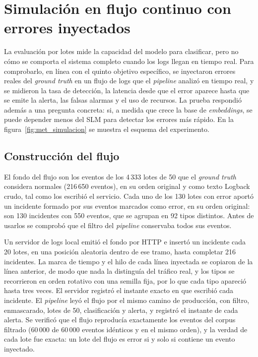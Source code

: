 \section{Simulación en flujo continuo con errores inyectados}\label{sec:met_simulacion}\label{sec:met_inyeccion}

La evaluación por lotes mide la capacidad del modelo para clasificar, pero no cómo se comporta el sistema completo cuando los logs llegan en tiempo real. Para comprobarlo, en línea con el quinto objetivo específico, se inyectaron errores reales del \textit{ground truth} en un flujo de logs que el \textit{pipeline} analizó en tiempo real, y se midieron la tasa de detección, la latencia desde que el error aparece hasta que se emite la alerta, las falsas alarmas y el uso de recursos. La prueba respondió además a una pregunta concreta: si, a medida que crece la base de \textit{embeddings}, se puede depender menos del SLM para detectar los errores más rápido. En la figura~\ref{fig:met_simulacion} se muestra el esquema del experimento.


\subsection{Construcción del flujo}

El fondo del flujo son los eventos de los 4\,333 lotes de 50 que el \textit{ground truth} considera normales (216\,650 eventos), en su orden original y como texto Logback crudo, tal como los escribió el servicio. Cada uno de los 130 lotes con error aportó un incidente formado por sus eventos marcados como error, en su orden original: son 130 incidentes con 550 eventos, que se agrupan en 92 tipos distintos. Antes de usarlos se comprobó que el filtro del \textit{pipeline} conservaba todos sus eventos.

Un servidor de logs local emitió el fondo por HTTP e insertó un incidente cada 20 lotes, en una posición aleatoria dentro de ese tramo, hasta completar 216 incidentes. La marca de tiempo y el hilo de cada línea inyectada se copiaron de la línea anterior, de modo que nada la distinguía del tráfico real, y los tipos se recorrieron en orden rotativo con una semilla fija, por lo que cada tipo apareció hasta tres veces. El servidor registró el instante exacto en que escribió cada incidente. El \textit{pipeline} leyó el flujo por el mismo camino de producción, con filtro, enmascarado, lotes de 50, clasificación y alerta, y registró el instante de cada alerta. Se verificó que el flujo reproducía exactamente los eventos del corpus filtrado (60\,000 de 60\,000 eventos idénticos y en el mismo orden), y la verdad de cada lote fue exacta: un lote del flujo es error si y solo si contiene un evento inyectado.

